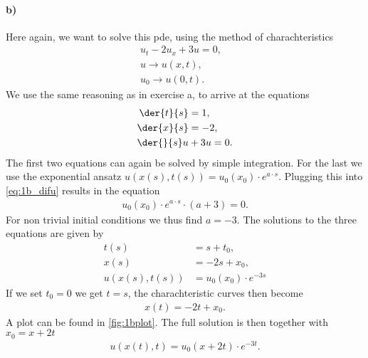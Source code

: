 \paragraph{b)}
Here again, we want to solve this pde, using the method of charachteristics
\begin{align}
u_t - 2u_x +3u=0,&\label{eq:1b}\\
u \rightarrow u(x,t),&\\
u_0 \rightarrow u(0,t).&
\end{align}
We use the same reasoning as in exercise a, to arrive at the equations
\begin{align}
\der{t}{s} &= 1,\\
\der{x}{s}&=-2,\\
\der{}{s}u&+3u=0.\label{eq:1b_difu}
\end{align}
The first two equations can again be solved by simple integration. For the last we use the exponential ansatz $u(x(s),t(s)) = u_0(x_0)\cdot e^{a\cdot s}$. Plugging this into \cref{eq:1b_difu} results in the equation
\begin{align}
 u_0(x_0)\cdot e^{a\cdot s}\cdot(a+3) = 0.
\end{align}
For non trivial initial conditions we thus find $a=-3$. The solutions to the three equations are given by 
\begin{align}
t(s)&=s+t_0,\\
x(s)&=-2s+x_0,\\
u(x(s),t(s))&=u_0(x_0)\cdot e^{-3s}
\end{align}
If we set $t_0=0$ we get $t=s$, the charachteristic curves then become
\begin{align}
x(t)=-2t+x_0.\label{eq:1b_charch_curve}
\end{align}
A plot can be found in \cref{fig:1bplot}.
The full solution is then together with $x_0=x+2t$
\begin{align}
u(x(t),t)=u_0(x+2t)\cdot e^{-3t}.
\end{align}
\begin{figure}
\hfill
{}
\end{figure}